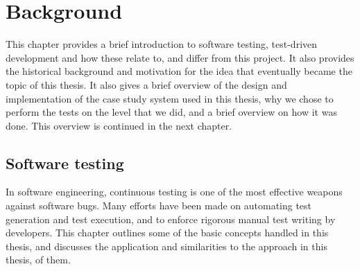 \chapter{Background}
\label{ch:background}
This chapter provides a brief introduction to software testing, test-driven development and how these relate to, and differ from this project. It also provides the historical background and motivation for the idea that eventually became the topic of this thesis. It also gives a brief overview of the design and implementation of the case study system used in this thesis, why we chose to perform the tests on the level that we did, and a brief overview on how it was done. This overview is continued in the next chapter.

\section{Software testing}
In software engineering, continuous testing is one of the most effective weapons against software bugs. Many efforts have been made on automating test generation and test execution, and to enforce rigorous manual test writing by developers. This chapter outlines some of the basic concepts handled in this thesis, and discusses the application and similarities to the approach in this thesis, of them.

